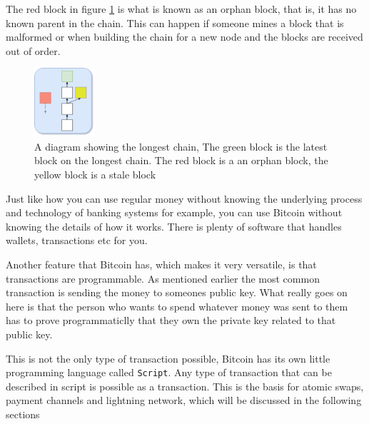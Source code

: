 The red block in figure \ref{fig:blockchain2} is what is known as an orphan
block, that is, it has no known parent in the chain. This can happen if someone
mines a block that is malformed or when building the chain for a new node and
the blocks are received out of order.

\begin{figure}[H]
	\centering
	\includegraphics[width=0.2\textwidth]{introduction/images/more_blockchain.png}
	\caption{A diagram showing the longest chain, The green block is the latest
	block on the longest chain. The red block is a an orphan block, the yellow
	block is a stale block}
	\label{fig:blockchain2}
\end{figure}


Just like how you can use regular money without knowing the underlying process
and technology of banking systems for example, you can use Bitcoin without
knowing the details of how it works. There is plenty of software that handles
wallets, transactions etc for you.


Another feature that Bitcoin has, which makes it very versatile, is that transactions are programmable.
As mentioned earlier the most
common transaction is sending the money to someones public key. What really
goes on here is that the person who wants to spend whatever money was sent to
them has to prove programmaticlly that they own the private key related to that
public key.

This is not the only type of transaction possible, Bitcoin has its own little
programming language called \texttt{Script}. Any type of transaction that can
be described in script is possible as a transaction. This is the basis for atomic swaps, payment channels and lightning network, which will be discussed in the following sections
